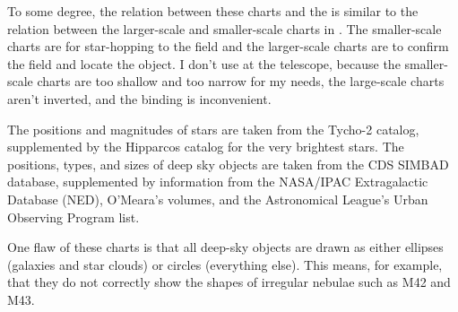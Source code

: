To some degree, the relation between these charts and the {\PSA} is similar to the relation between the larger-scale and smaller-scale charts in . The smaller-scale charts are for star-hopping to the field and the larger-scale charts are to confirm the field and locate the object. I don’t use  at the telescope, because the smaller-scale charts are too shallow and too narrow for my needs, the large-scale charts aren’t inverted, and the binding is inconvenient.

\bigskip

The positions and magnitudes of stars are taken from the Tycho-2 catalog, supplemented by the Hipparcos catalog for the very brightest stars. The positions, types, and sizes of deep sky objects are taken from the CDS SIMBAD database, supplemented by information from the NASA/IPAC Extragalactic Database (NED), O’Meara’s  volumes, and the Astronomical League’s Urban Observing Program list.

\bigskip

One flaw of these charts is that all deep-sky objects are drawn as either ellipses (galaxies and star clouds) or circles (everything else). This means, for example, that they do not correctly show the shapes of irregular nebulae such as M42 and M43.

